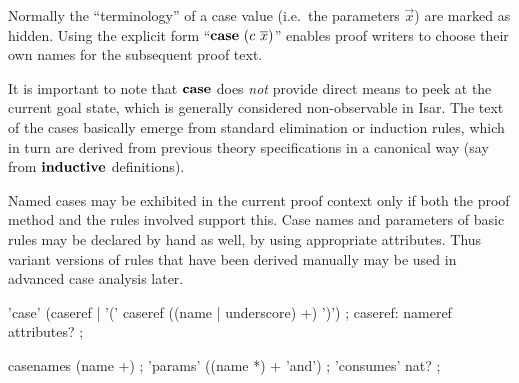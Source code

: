 Normally the ``terminology'' of a case value (i.e.\ the parameters $\vec x$)
are marked as hidden.  Using the explicit form ``${\mathord{\mathbf{case}}}~(c~\overline{x})$'' enables
proof writers to choose their own names for the subsequent proof text.

\medskip

It is important to note that ${\mathord{\mathbf{case}}}$ does \emph{not} provide direct means
to peek at the current goal state, which is generally considered
non-observable in Isar.  The text of the cases basically emerge from standard
elimination or induction rules, which in turn are derived from previous theory
specifications in a canonical way (say from ${\mathord{\mathbf{inductive}}}$
definitions).

Named cases may be exhibited in the current proof context only if both the
proof method and the rules involved support this.  Case names and parameters
of basic rules may be declared by hand as well, by using appropriate
attributes.  Thus variant versions of rules that have been derived manually
may be used in advanced case analysis later.


\begin{rail}
  'case' (caseref | '(' caseref ((name | underscore) +) ')')
  ;
  caseref: nameref attributes?
  ;

  casenames (name +)
  ;
  'params' ((name *) + 'and')
  ;
  'consumes' nat?
  ;
\end{rail}

